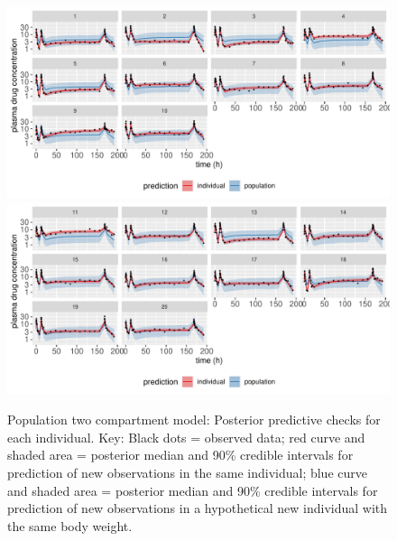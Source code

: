 \begin{figure}
  \begin{center}
  \includegraphics[width=6in]{../figures/twocpt_pop_ppc1.pdf} \\
  \includegraphics[width=6in]{../figures/twocpt_pop_ppc2.pdf}
  \end{center}
  \caption{Population two compartment model: Posterior predictive
    checks for each individual. Key: Black dots = observed data; red
    curve and shaded area = posterior median and 90\% credible
    intervals for prediction of new observations in the same
    individual; blue curve and shaded area = posterior median and 90\% credible
    intervals for prediction of new observations in a hypothetical new
    individual with the same body weight.}
  \label{fig:twoCptPop_ppc}
\end{figure}

